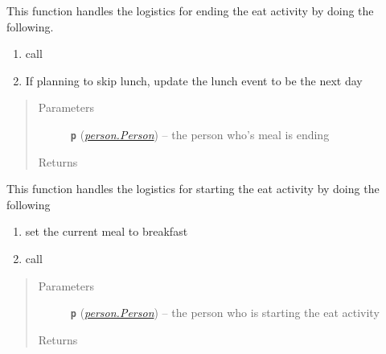 \documentclass[letterpaper,10pt,english]{sphinxmanual}
\begin{document}
\begin{fulllineitems}

\begin{fulllineitems}
\label{eat:eat.Eat_Breakfast.end_meal}
This function handles the logistics for ending the eat activity by doing the following.
\begin{enumerate}
\item {} 
call 

\item {} 
If planning to skip lunch, update the lunch event to be the next day

\end{enumerate}
\begin{quote}\begin{description}
\item[{Parameters}] \leavevmode
\textbf{\texttt{p}} ({\hyperref[person:person.Person]{\emph{\emph{person.Person}}}}) -- the person who's meal is ending

\item[{Returns}] \leavevmode


\end{description}\end{quote}

\end{fulllineitems}


\begin{fulllineitems}
\label{eat:eat.Eat_Breakfast.start_meal}
This function handles the logistics for starting the eat activity by doing the following
\begin{enumerate}
\item {} 
set the current meal to breakfast

\item {} 
call 

\end{enumerate}
\begin{quote}\begin{description}
\item[{Parameters}] \leavevmode
\textbf{\texttt{p}} ({\hyperref[person:person.Person]{\emph{\emph{person.Person}}}}) -- the person who is starting the eat activity

\item[{Returns}] \leavevmode


\end{description}\end{quote}

\end{fulllineitems}


\end{fulllineitems}
\end{document}
